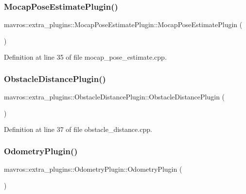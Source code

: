 \subsubsection{\texorpdfstring{MocapPoseEstimatePlugin()}{MocapPoseEstimatePlugin()}}
{\footnotesize\ttfamily mavros\+::extra\+\_\+plugins\+::\+Mocap\+Pose\+Estimate\+Plugin\+::\+Mocap\+Pose\+Estimate\+Plugin (\begin{DoxyParamCaption}{ }\end{DoxyParamCaption})\hspace{0.3cm}{\ttfamily [inline]}}



Definition at line 35 of file mocap\+\_\+pose\+\_\+estimate.\+cpp.

\mbox{\label{group__plugin_gaab73ed3ac03f5dbde2e6ddd4264ccfb2}} 
\subsubsection{\texorpdfstring{ObstacleDistancePlugin()}{ObstacleDistancePlugin()}}
{\footnotesize\ttfamily mavros\+::extra\+\_\+plugins\+::\+Obstacle\+Distance\+Plugin\+::\+Obstacle\+Distance\+Plugin (\begin{DoxyParamCaption}{ }\end{DoxyParamCaption})\hspace{0.3cm}{\ttfamily [inline]}}



Definition at line 37 of file obstacle\+\_\+distance.\+cpp.

\mbox{\label{group__plugin_gaa5846c0b3650b8c78b7645ef11425752}} 
\subsubsection{\texorpdfstring{OdometryPlugin()}{OdometryPlugin()}}
{\footnotesize\ttfamily mavros\+::extra\+\_\+plugins\+::\+Odometry\+Plugin\+::\+Odometry\+Plugin (\begin{DoxyParamCaption}{ }\end{DoxyParamCaption})\hspace{0.3cm}{\ttfamily [inline]}}



